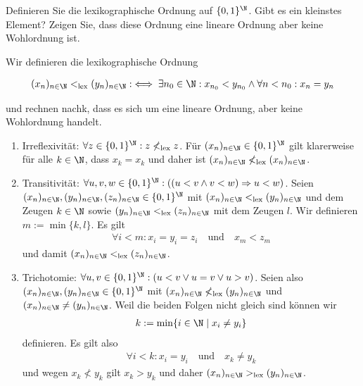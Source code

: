 
\begin{exercise}[240]

Definieren Sie die lexikographische Ordnung auf $\{0,1\}^{\N}$. Gibt es ein kleinstes Element?
Zeigen Sie, dass diese Ordnung eine lineare Ordnung aber keine Wohlordnung ist.

\end{exercise}


\begin{solution}
	
	Wir definieren die lexikographische Ordnung

\begin{align*}
  (x_n)_{n\in\N} <_{\mathrm{lex}} (y_n)_{n\in\N}
  :\iff \exists n_0 \in \N: x_{n_0} < y_{n_0} \land \forall n < n_0: x_n = y_n
\end{align*}

	und rechnen nachk, dass es sich um eine lineare Ordnung, aber keine Wohlordnung handelt.
	
	\begin{enumerate}
		\item Irreflexivität: $\forall z \in \{0,1\}^\N: z \nless_{\mathrm{lex}} z$. Für $(x_n)_{n \in \N} \in \{0,1\}^\N$ gilt klarerweise für alle $k \in \N$, dass $x_k = x_k$ und daher ist $(x_n)_{n \in \N} \nless_{\mathrm{lex}} (x_n)_{n \in \N}$. 
		
		\item Transitivität: $\forall u,v,w \in \{0,1\}^\N: ((u < v \land v < w) \Rightarrow u < w)$. Seien $(x_n)_{n \in \N}, (y_n)_{n \in \N}, (z_n)_{n \in \N} \in \{0,1\}^\N$ mit $(x_n)_{n \in \N} <_{\mathrm{lex}} (y_n)_{n \in \N}$ und dem Zeugen $k \in \N$ sowie  $(y_n)_{n \in \N} <_{\mathrm{lex}} (z_n)_{n \in \N}$ mit dem Zeugen $l$. Wir definieren $m := \min\{k,l\}$. Es gilt
			\begin{align*}
				\forall i < m: x_i = y_i = z_i  \quad \text{und} \quad x_m < z_m
			\end{align*}
		und damit $(x_n)_{n \in \N} <_{\mathrm{lex}} (z_n)_{n \in \N}$.
		
		\item Trichotomie: $\forall u,v \in \{0,1\}^\N: (u < v \lor u = v \lor u > v)$. Seien also $(x_n)_{n \in \N}, (y_n)_{n \in \N} \in \{0,1\}^\N$ mit $(x_n)_{n \in \N} \nless_{\mathrm{lex}} (y_n)_{n \in \N}$ und $(x_n)_{n \in \N} \neq (y_n)_{n \in \N}$. Weil die beiden Folgen nicht gleich sind können wir 
		\begin{align*}
			k := \min\{i \in \N \mid x_i \neq y_i\}
		\end{align*}
		definieren. Es gilt also
			\begin{align*}
				\forall i < k: x_i = y_i \quad \text{und} \quad x_k \neq y_k
			\end{align*}
			und wegen $x_k \nless y_k$ gilt $x_k > y_k$ und daher $(x_n)_{n \in \N} >_{\mathrm{lex}} (y_n)_{n \in \N}$.
			

\end{enumerate}
\end{solution}
